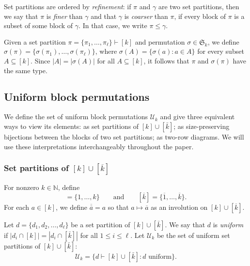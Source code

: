 \documentclass[10pt]{amsart}
\theoremstyle{definition}
\theoremstyle{remark}
\newcommand{\defncolor}{\color{darkred}}
\newcommand{\defn}[1]{{\defncolor\emph{#1}}} %
\begin{document}
Set partitions are ordered by \defn{refinement}: if $\pi$ and $\gamma$ are two set partitions, then we say that $\pi$ is \defn{finer}
than $\gamma$ and that $\gamma$ is \defn{coarser} than $\pi$, if every block of $\pi$ is a subset of some block of $\gamma$. In that case,
we write $\pi\leqslant \gamma$.

Given a set partition $\pi = \{\pi_1, \ldots, \pi_\ell\} \vdash [k]$
and permutation $\sigma \in \mathfrak{S}_k$, we define
$\sigma(\pi) = \{\sigma(\pi_1), \ldots, \sigma(\pi_\ell)\}$,
where $\sigma(A) = \{\sigma(a) : a\in A\}$ for every subset $A \subseteq [k]$.
Since $|A| = |\sigma(A)|$ for all $A \subseteq [k]$, it follows that
$\pi$ and $\sigma(\pi)$ have the same type.

\subsection{Uniform block permutations}
\label{section.UBP}

We define the set of uniform block permutations $\mathcal{U}_k$ and give
three equivalent ways to view its elements:
as set partitions of $[k]\cup [\bar{k}]$;
as size-preserving bijections between the blocks of two set partitions;
as two-row diagrams.
We will use these interpretations interchangeably throughout the paper.

\subsubsection{Set partitions of $[k] \cup [\overline{k}]$}
For nonzero $k\in \mathbb{N}$, define
\begin{equation*}
    [k]= \{1, \dots, k\}
    \qquad\text{and}\qquad
    [\overline{k}] = \{\overline{1}, \ldots, \overline{k}\}.
\end{equation*}
For each $a \in [k]$, we define $\overline{\overline{a}} = a$ so that
$a \mapsto \overline{a}$ as an involution on $[k] \cup [\overline{k}]$.

Let $d = \{d_1, d_2, \ldots, d_\ell\}$ be a set partition of $[k]\cup [\bar{k}]$.
We say that $d$ is \defn{uniform} if
$|d_i\cap [k]|= |d_i\cap [\bar{k}]|$ for all $1\leqslant i\leqslant \ell$.
Let $\mathcal{U}_k$ be the set of uniform set partitions of $[k] \cup [\bar{k}]$:
\[
    \mathcal{U}_k = \big\{ d \vdash [k]\cup[\bar{k}]: \text{$d$ uniform}\big\}.
\]
\end{document}
